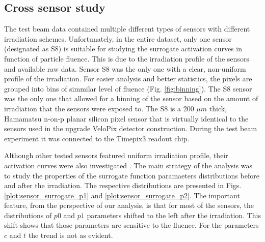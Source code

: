 \subsection{Cross sensor study}
The test beam data contained multiple different types of sensors with different irradiation schemes.
Unfortunately, in the entire dataset, only one sensor (designated as S8) is suitable for studying the surrogate activation curves in function of particle fluence.
This is due to the irradiation profile of the sensors and available raw data.
Sensor S8 was the only one with a clear, non-uniform profile of the irradiation.
For easier analysis and better statistics, the pixels are grouped into bins of simmilar level of fluence (Fig. \ref{fig:binning}).
The S8 sensor was the only one that allowed for a binning of the sensor based on the amount of irradiation that the sensors were exposed to. The S8 is a 200 $\mu m$ thick, Hamamatsu n-on-p planar silicon pixel sensor that is virtually identical to the sensors used in the upgrade VeloPix detector construction. During the test beam experiment it was connected to the Timepix3 readout chip.

Although other tested sensors featured uniform irradiation profile, their activation curves were also investigated . 
The main strategy of the analysis was to study the properties of the surrogate function paramaeters distributions before and after the irradiation. 
The respective distributions are presented in Figs. \ref{plot:sensor_surrogate_p1}  and \ref{plot:sensor_surrogate_p2}.
The important feature, from the perspective of our analysis, is that for most of the sensors, the distributions of $p0$ and $p1$ parameters shifted to the left after the irradiation. This shift shows that those parameters are sensitive to the fluence.
For the parameters $c$ and $t$ the trend is not as evident.

